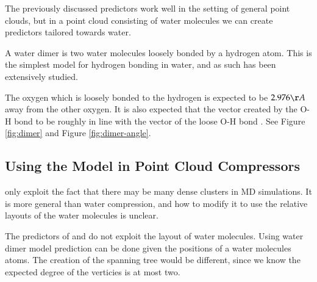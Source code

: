 \documentclass[a4paper]{report}
\begin{document}
The previously discussed predictors work well in the setting of general point
clouds, but in a point cloud consisting of water molecules we can create
predictors tailored towards water.

A water dimer is two water molecules loosely bonded by a hydrogen atom. This
is the simplest model for hydrogen bonding in water, and as such has been
extensively studied.

The oxygen which is loosely bonded to the hydrogen is expected to be
$2.976\AA$ away from the other oxygen. It is also expected that the vector
created by the O-H bond to be roughly in line with the vector of the loose O-H
bond \citep{watermolecule}. See Figure \ref{fig:dimer} and Figure
\ref{fig:dimer-angle}.

\subsection{Using the Model in Point Cloud Compressors}

\citet{omeltchenko2000sls} only exploit the fact that there may be many dense
clusters in MD simulations. It is more general than water compression, and how
to modify it to use the relative layouts of the water molecules is unclear.

The predictors of \citet{merrycomp} and \citet{gumholdcomp} do not exploit the
layout of water molecules. Using water dimer model prediction can be done
given the positions of a water molecules atoms. The creation of the spanning
tree would be different, since we know the expected degree of the verticies is
at most two.
\end{document}
